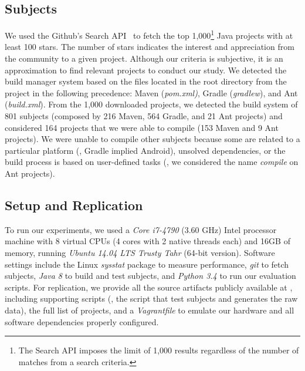 \subsection{Subjects}
\label{sec:subjects}

We used the Github's
Search API~\cite{githubsearch} to fetch the top 1,000\footnote{The
Search API imposes the limit of 1,000 results regardless of the number
of matches from a search criteria.} Java projects with at least 100
stars. The number of stars indicates the interest and appreciation
from the community to a given project.
 Although our
criteria is subjective, it is an approximation to find relevant
projects to conduct our study. We detected the build manager system
based on the files located in the root directory from the project in
the following precedence: Maven (\emph{pom.xml)}, Gradle
(\emph{gradlew}), and Ant (\emph{build.xml}).
From the 1,000 downloaded projects, we detected the build system of
801 subjects (composed by 216 Maven, 564 Gradle, and 21 Ant projects)
and considered 164 projects that we were able to compile (153 Maven
and 9 Ant projects).  We were unable to compile other subjects because
some are related to a particular platform (\eg, Gradle implied
Android), unsolved dependencies, or the build process is based on
user-defined tasks (\eg, we considered the name \emph{compile} on Ant
projects).

\subsection{Setup and Replication}
\label{sec:setup}

To run our experiments, we used a \emph{Core i7-4790} (3.60 GHz) Intel
processor machine with 8 virtual CPUs (4 cores with 2 native threads
each) and 16GB of memory, running \emph{Ubuntu 14.04 LTS Trusty Tahr}
(64-bit version). Software settings include the Linux \emph{sysstat}
package to measure performance, \emph{git} to fetch subjects,
\emph{Java 8} to build and test subjects, and \emph{Python 3.4} to run
our evaluation scripts. For replication, we provide all the source
artifacts publicly available at , including
supporting scripts (\eg, the script that test subjects and generates
the raw data), the full list of projects, and a \emph{Vagrantfile} to
emulate our hardware and all software dependencies properly configured.

